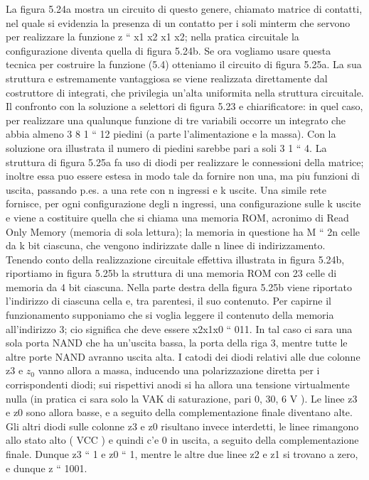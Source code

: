 \documentclass[a4paper]{extarticle}
\begin{document}
La figura 5.24a mostra un circuito di questo genere, chiamato matrice di contatti, nel quale
si evidenzia la presenza di un contatto per i soli minterm che servono per realizzare la funzione z “ x1 x2   x1 x2;
nella pratica circuitale la configurazione diventa quella di figura 5.24b. Se ora vogliamo usare questa tecnica per
costruire la funzione (5.4) otteniamo il circuito di figura 5.25a. La sua struttura e estremamente vantaggiosa se
viene realizzata direttamente dal costruttore di integrati, che privilegia un’alta uniformita nella struttura circuitale.
Il confronto con la soluzione a selettori di figura 5.23 e chiarificatore: in quel caso, per realizzare una qualunque
funzione di tre variabili occorre un integrato che abbia almeno 3   8   1 “ 12 piedini (a parte l’alimentazione
e la massa). Con la soluzione ora illustrata il numero di piedini sarebbe pari a soli 3   1 “ 4. La struttura di
figura 5.25a fa uso di diodi per realizzare le connessioni della matrice; inoltre essa puo essere estesa in modo tale
da fornire non una, ma piu funzioni di uscita, passando p.es. a una rete con   n ingressi e k uscite. Una simile rete
fornisce, per ogni configurazione degli n ingressi, una configurazione sulle k uscite e viene a costituire quella che
si chiama una memoria ROM, acronimo di Read Only Memory (memoria di sola lettura); la memoria in questione
ha M “ 2n celle da k bit ciascuna, che vengono indirizzate dalle n linee di indirizzamento. Tenendo conto della
realizzazione circuitale effettiva illustrata in figura 5.24b, riportiamo in figura 5.25b la struttura di una memoria
ROM con 23 celle di memoria da 4 bit ciascuna.
Nella parte destra della figura 5.25b viene riportato l’indirizzo di ciascuna cella e, tra parentesi, il suo contenuto.
Per capirne il funzionamento supponiamo che si voglia leggere il contenuto della memoria all’indirizzo 3; cio
significa che deve essere x2x1x0 “ 011. In tal caso ci sara una sola porta NAND che ha un’uscita bassa, la porta
della riga 3, mentre tutte le altre porte NAND avranno uscita alta. I catodi dei diodi relativi alle due colonne z3 e \(z_0\) vanno allora a massa, inducendo una polarizzazione diretta per i corrispondenti diodi; sui rispettivi anodi si ha
allora una tensione virtualmente nulla (in pratica ci sara solo la   VAK di saturazione, pari 0, 30, 6 V ). Le linee z3
e z0 sono allora basse, e a seguito della complementazione finale diventano alte. Gli altri diodi sulle colonne z3
e z0 risultano invece interdetti, le linee rimangono allo stato alto ( VCC ) e quindi c’e  0 in uscita, a seguito della
complementazione finale. Dunque z3 “ 1 e z0 “ 1, mentre le altre due linee z2 e z1 si trovano a zero, e dunque
z “ 1001.
\end{document}
